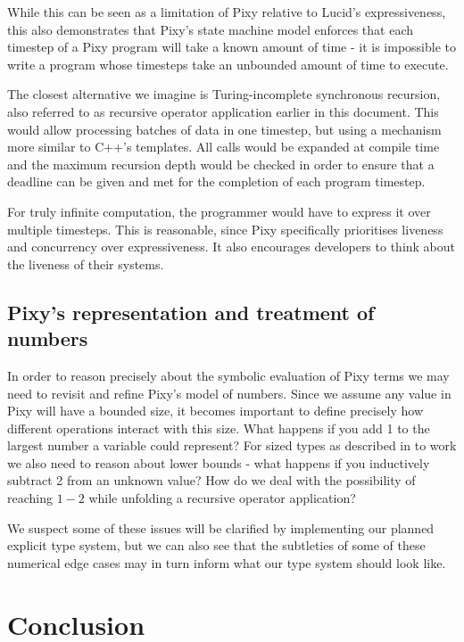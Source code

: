 \documentclass{scrartcl}
\begin{document}
    While this can be seen as a limitation of Pixy relative to Lucid's expressiveness, this also demonstrates that Pixy's state machine model enforces that each timestep of a Pixy program will take a known amount of time - it is impossible to write a program whose timesteps take an unbounded amount of time to execute.
    
    The closest alternative we imagine is Turing-incomplete synchronous recursion, also referred to as recursive operator application earlier in this document. This would allow processing batches of data in one timestep, but using a mechanism more similar to C++'s templates. All calls would be expanded at compile time and the maximum recursion depth would be checked in order to ensure that a deadline can be given and met for the completion of each program timestep.
    
    For truly infinite computation, the programmer would have to express it over multiple timesteps. This is reasonable, since Pixy specifically prioritises liveness and concurrency over expressiveness. It also encourages developers to think about the liveness of their systems.
    
    \subsection{Pixy's representation and treatment of numbers}
    
    In order to reason precisely about the symbolic evaluation of Pixy terms we may need to revisit and refine Pixy's model of numbers. Since we assume any value in Pixy will have a bounded size, it becomes important to define precisely how different operations interact with this size. What happens if you add 1 to the largest number a variable could represent? For sized types as described in \cite{abel} to work we also need to reason about lower bounds - what happens if you inductively subtract 2 from an unknown value? How do we deal with the possibility of reaching $1-2$ while unfolding a recursive operator application?
    
    We suspect some of these issues will be clarified by implementing our planned explicit type system, but we can also see that the subtleties of some of these numerical edge cases may in turn inform what our type system should look like.
    
    \section{Conclusion}
    
\end{document}
